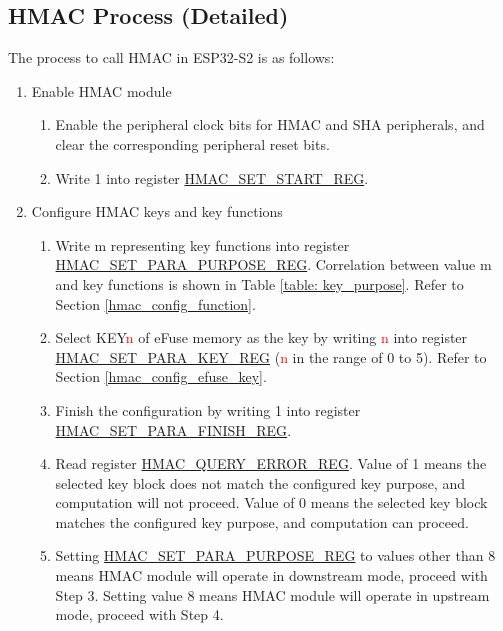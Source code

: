\documentclass[main\_\_EN.tex]{subfiles}
\begin{document}
\subsection{HMAC Process (Detailed)}
\label{hmac_process_detailed}
The process to call HMAC in ESP32-S2 is as follows:

\begin{enumerate}
    \item Enable HMAC module
    \begin{enumerate}
        \item Enable the peripheral clock bits for HMAC and SHA peripherals, and clear the corresponding peripheral reset bits.
        \item Write 1 into register \hyperref[regdesc:HMACSETSTARTREG]{HMAC\_SET\_START\_REG}.
    \end{enumerate}

    \item Configure HMAC keys and key functions
    \begin{enumerate}
        \item Write m representing key functions into register \hyperref[regdesc:HMACSETPARAPURPOSEREG]{HMAC\_SET\_PARA\_PURPOSE\_REG}. Correlation between value m and key functions is shown in Table \ref{table: key_purpose}. Refer to Section \ref{hmac_config_function}.
        \item Select KEY\textcolor{red}{n} of eFuse memory as the key by writing \textcolor{red}{n} into register \hyperref[regdesc:HMACSETPARAKEYREG]{HMAC\_SET\_PARA\_KEY\_REG} (\textcolor{red}{n} in the range of 0 to 5). Refer to Section \ref{hmac_config_efuse_key}.
        \item Finish the configuration by writing 1 into register \hyperref[regdesc:HMACSETPARAFINISHREG]{HMAC\_SET\_PARA\_FINISH\_REG}.
        \item Read register \hyperref[regdesc:HMACQUERYERRORREG]{HMAC\_QUERY\_ERROR\_REG}. Value of 1 means the selected key block does not match the configured key purpose, and computation will not proceed. Value of 0 means the selected key block matches the configured key purpose, and computation can proceed.
        \item Setting \hyperref[regdesc:HMACSETPARAPURPOSEREG]{HMAC\_SET\_PARA\_PURPOSE\_REG} to values other than 8 means HMAC module will operate in downstream mode, proceed with Step 3. Setting value 8 means HMAC module will operate in upstream mode, proceed with Step 4.
    \end{enumerate}


\end{enumerate}
\end{document}
